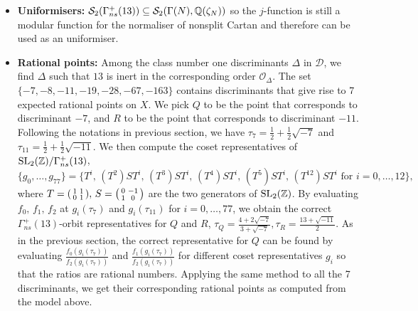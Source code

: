 \begin{itemize}
\item \textbf{Uniformisers:} $\mathcal{S}_2(\Gamma_{ns}^+(13)) \subseteq \mathcal{S}_2(\Gamma(N), \mathbb{Q}(\zeta_N))$ so the $j$-function is still a modular function for the normaliser of nonsplit Cartan and therefore can be used as an uniformiser.

\item \textbf{Rational points: } Among the class number one discriminants $\Delta$ in $\mathcal{D}$, we find $\Delta$ such that $13$ is inert in the corresponding order $\mathcal{O}_\Delta$. The set $\{ -7,-8,-11,-19,-28,-67,-163 \}$ contains discriminants that give rise to 7 expected rational points on $X$. We pick $Q$ to be the point that corresponds to discriminant $-7$, and $R$ to be the point that corresponds to discriminant $-11$. Following the notations in previous section, we have $\tau_7 = \frac{1}{2} + \frac{1}{2}\sqrt{-7}$ and $\tau_{11} = \frac{1}{2} + \frac{1}{2}\sqrt{-11}$. We then compute the coset representatives of $\operatorname{SL}_2(\mathbb{Z})/\Gamma_{ns}^+(13)$,
\[\{g_0,\ldots,g_{77}\} = \{T^i,\, (T^2)ST^i,\, (T^3)ST^i,\,(T^4)ST^i,\,(T^5)ST^i,\,(T^{12})ST^i \mbox{ for } i = 0,\ldots,12\},\] where $T =\begin{psmallmatrix}
1 & 1\\
0 & 1
\end{psmallmatrix} ,\,S=\begin{psmallmatrix}
0 & -1\\
1 & 0
\end{psmallmatrix}$ are the two generators of $\operatorname{SL}_2(\mathbb{Z})$. By evaluating $f_0,\,f_1,\,f_2$ at $g_i(\tau_7)$ and $g_i(\tau_{11})$ for $i=0,\ldots,77$, we obtain the correct $\Gamma_{ns}^+(13)$-orbit representatives for $Q$ and $R$, $\tau_Q = \frac{4 + 2\sqrt{-7}}{3 + \sqrt{-7}}, \tau_R = \frac{13 + \sqrt{-11}}{2}$. As in the previous section, the correct representative for $Q$ can be found by evaluating $\frac{f_0(g_i(\tau_7))}{f_2(g_i(\tau_7))}$ and $\frac{f_1(g_i(\tau_7))}{f_2(g_i(\tau_7))}$ for different coset representatives $g_i$ so that the ratios are rational numbers. Applying the same method to all the 7 discriminants, we get their corresponding rational points as computed from the model above.



\end{itemize}
